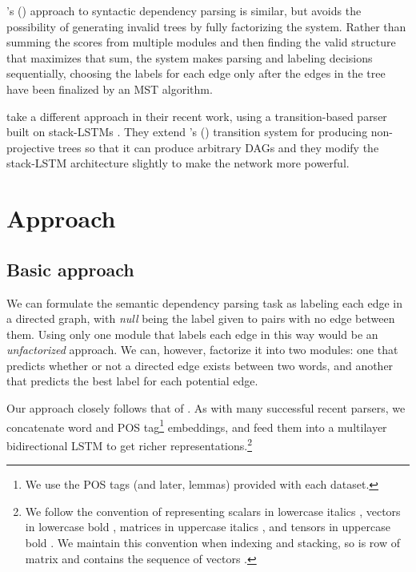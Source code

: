 \documentclass[11pt,a4paper]{article}
\newcommand{\citea}[1]{\citeauthor{#1}'s (\citeyear{#1})}
\begin{document}
\citea{DozatManning2017} approach to syntactic dependency parsing is similar, but avoids the possibility of generating invalid trees by fully factorizing the system. Rather than summing the scores from multiple modules and then finding the valid structure that maximizes that sum, the system makes parsing and labeling decisions sequentially, choosing the labels for each edge only after the edges in the tree have been finalized by an MST algorithm.

\citet{Wangetal2018} take a different approach in their recent work, using a transition-based parser built on stack-LSTMs \citep{Dyeretal2015}. They extend \citea{ChoiMccallum2013} transition system for producing non-projective trees so that it can produce arbitrary DAGs and they modify the stack-LSTM architecture slightly to make the network more powerful.

\section{Approach}
\subsection{Basic approach}
We can formulate the semantic dependency parsing task as labeling each edge in a directed graph, with \emph{null} being the label given to pairs with no edge between them. Using only one module that labels each edge in this way would be an \emph{unfactorized} approach. We can, however, factorize it into two modules: one that predicts whether or not a directed edge  exists between two words, and another that predicts the best label for each potential edge.

Our approach closely follows that of \citet{DozatManning2017}. As with many successful recent parsers, we concatenate word and POS tag\footnote{We use the POS tags (and later, lemmas) provided with each dataset.} embeddings, and feed them into a multilayer bidirectional LSTM to get richer representations.\footnote{We follow the convention of representing scalars in lowercase italics , vectors in lowercase bold , matrices in uppercase italics , and tensors in uppercase bold . We maintain this convention when indexing and stacking, so  is row  of matrix  and  contains the sequence of vectors .}
\end{document}
